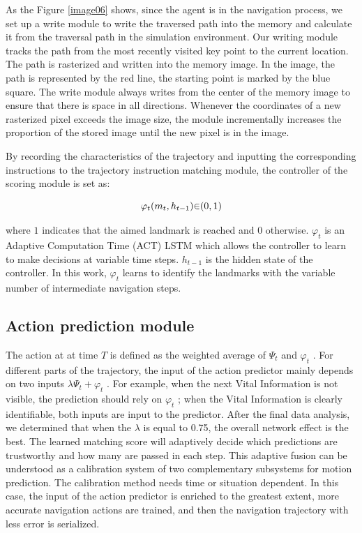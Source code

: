 As the Figure \ref{image06} shows, since the agent is in the navigation process, we set up a write module to write the traversed path into the memory and calculate it from the traversal path in the simulation environment. Our writing module tracks the path from the most recently visited key point to the current location. The path is rasterized and written into the memory image. In the image, the path is represented by the red line, the starting point is marked by the blue square. The write module always writes from the center of the memory image to ensure that there is space in all directions. Whenever the coordinates of a new rasterized pixel exceeds the image size, the module incrementally increases the proportion of the stored image until the new pixel is in the image.

By recording the characteristics of the trajectory and inputting the corresponding instructions to the trajectory instruction matching module, the controller of the scoring module is set as:

\begin{equation}
	\centering
	{\varphi}_{t}({m}_{t},{h}_{t-1}){\in}{({0},{1})}
\end{equation}

where ${1}$ indicates that the aimed landmark is reached and ${0}$ otherwise. ${{\varphi}_{t}}$ is an Adaptive Computation Time (ACT) LSTM which allows the controller to learn to make decisions at variable time steps. ${h}_{t-1}$ is the hidden state of the controller. In this work, ${{\varphi}_{t}}$ learns to identify the landmarks with the variable number of intermediate navigation steps.

\subsection{Action prediction module}

The action at at time ${T}$ is defined as the weighted average of ${{\Psi}_{t}}$ and ${{\varphi}_{t}}$ . For different parts of the trajectory, the input of the action predictor mainly depends on  two inputs ${{\lambda}{\Psi}_{t} + {\varphi}_{t}}$ . For example, when the next Vital Information is not visible, the prediction should rely on ${{\varphi}_{t}}$ ; when the Vital Information is clearly identifiable, both inputs are input to the predictor. After the final data analysis, we determined that when the ${\lambda}$  is equal to 0.75, the overall network effect is the best. The learned matching score will adaptively decide which predictions are trustworthy and how many are passed in each step. This adaptive fusion can be understood as a calibration system of two complementary subsystems for motion prediction. The calibration method needs time or situation dependent. In this case, the input of the action predictor is enriched to the greatest extent, more accurate navigation actions are trained, and then the navigation trajectory with less error is serialized.

